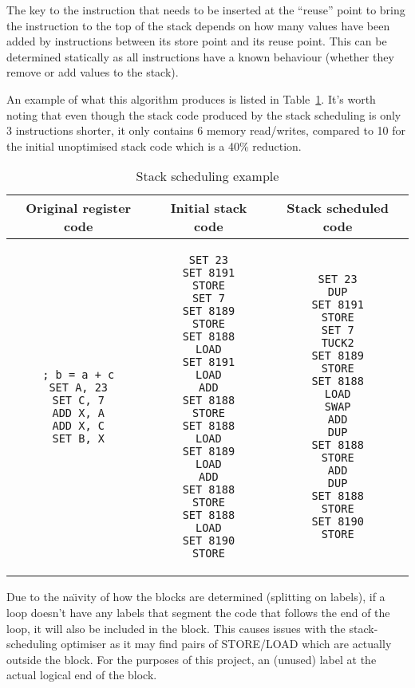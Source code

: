 The key to the instruction that needs to be inserted at the ``reuse'' point to
bring the instruction to the top of the stack depends on how many values have
been added by instructions between its store point and its reuse point. This can
be determined statically as all instructions have a known behaviour (whether
they remove or add values to the stack).

An example of what this algorithm produces is listed in
Table~\ref{tab:scheduleex}. It's worth noting that even though the stack code
produced by the stack scheduling is only 3 instructions shorter, it only
contains 6 memory read/writes, compared to 10 for the initial unoptimised stack
code which is a 40\% reduction.

\begin{table}
\caption{Stack scheduling example}
\begin{tabular}{c c c}\label{tab:scheduleex}
  Original register code & Initial stack code & Stack scheduled code
  \\ \toprule
\begin{lstlisting}
; b = a + c
SET A, 23
SET C, 7
ADD X, A
ADD X, C
SET B, X
\end{lstlisting} &
\begin{lstlisting}
SET 23
SET 8191
STORE
SET 7
SET 8189
STORE
SET 8188
LOAD
SET 8191
LOAD
ADD
SET 8188
STORE
SET 8188
LOAD
SET 8189
LOAD
ADD
SET 8188
STORE
SET 8188
LOAD
SET 8190
STORE
\end{lstlisting} &
\begin{lstlisting}
SET 23
DUP
SET 8191
STORE
SET 7
TUCK2
SET 8189
STORE
SET 8188
LOAD
SWAP
ADD
DUP
SET 8188
STORE
ADD
DUP
SET 8188
STORE
SET 8190
STORE
\end{lstlisting} \\
\end{tabular}
\end{table}

Due to the na{\"\i}vity of how the blocks are determined (splitting on labels),
if a loop doesn't have any labels that segment the code that follows the end of
the loop, it will also be included in the block.  This causes issues with the
stack-scheduling optimiser as it may find pairs of STORE/LOAD which are actually
outside the block. For the purposes of this project, an (unused) label at the
actual logical end of the block.

